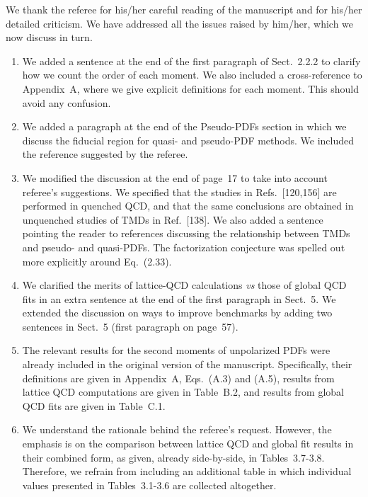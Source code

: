\documentclass[11pt]{article}
\begin{document}
We thank the referee for his/her careful reading of the manuscript and for 
his/her detailed criticism. We have addressed all the issues raised by 
him/her, which we now discuss in turn.

\begin{enumerate}

\item We added a sentence at the end of the first paragraph of Sect.~2.2.2
to clarify how we count the order of each moment. We also included a 
cross-reference to Appendix~A, where we give explicit definitions for each
moment. This should avoid any confusion.

\item We added a paragraph at the end of the Pseudo-PDFs section in which
we discuss the fiducial region for quasi- and pseudo-PDF methods.
We included the reference suggested by the referee. 

\item We modified the discussion at the end of page~17 to take into 
account referee's suggestions. We specified that
the studies in Refs.~[120,156] are performed in quenched QCD, and that the
same conclusions are obtained in unquenched studies of TMDs in Ref.~[138].
We also added a sentence pointing the reader to references discussing the
relationship between TMDs and pseudo- and quasi-PDFs.
The factorization conjecture was spelled out more explicitly around Eq.~(2.33).

\item We clarified the merits of lattice-QCD calculations {\it vs} those
of global QCD fits in an extra sentence at the end of the first paragraph
in Sect.~5. We extended the discussion on ways to improve benchmarks 
by adding two sentences in Sect.~5 (first paragraph on page~57).

\item The relevant results for the second moments of unpolarized PDFs
were already included in the original version of the manuscript. 
Specifically, their definitions are given in Appendix~A, Eqs.~(A.3) and (A.5),
results from lattice QCD computations are given in Table~B.2, and results from
global QCD fits are given in Table~C.1.

\item We understand the rationale behind the referee's request. However, the 
emphasis is on the comparison between lattice QCD and global fit results in 
their combined form, as given, already side-by-side, in Tables~3.7-3.8. 
Therefore, we refrain from including an additional table in which individual 
values presented in Tables~3.1-3.6 are collected altogether.


\end{enumerate}
\end{document}
